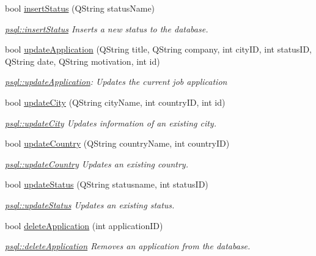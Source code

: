 \begin{DoxyCompactItemize}
bool \mbox{\hyperlink{classpsql_a601ee0bdc9430b1d674a857f7c94b767}{insert\+Status}} (Q\+String status\+Name)
\begin{DoxyCompactList}\small\item\em \mbox{\hyperlink{classpsql_a601ee0bdc9430b1d674a857f7c94b767}{psql\+::insert\+Status}} Inserts a new status to the database. \end{DoxyCompactList}\item 
bool \mbox{\hyperlink{classpsql_a836eea3c6deb2d6a3a357193a99d6ee7}{update\+Application}} (Q\+String title, Q\+String company, int city\+ID, int status\+ID, Q\+String date, Q\+String motivation, int id)
\begin{DoxyCompactList}\small\item\em \mbox{\hyperlink{classpsql_a836eea3c6deb2d6a3a357193a99d6ee7}{psql\+::update\+Application}}\+: Updates the current job application \end{DoxyCompactList}\item 
bool \mbox{\hyperlink{classpsql_a6adf2ba381783e520c03fe5324dcb010}{update\+City}} (Q\+String city\+Name, int country\+ID, int id)
\begin{DoxyCompactList}\small\item\em \mbox{\hyperlink{classpsql_a6adf2ba381783e520c03fe5324dcb010}{psql\+::update\+City}} Updates information of an existing city. \end{DoxyCompactList}\item 
bool \mbox{\hyperlink{classpsql_ae662278c5fb8ff3471ee1442e69482e2}{update\+Country}} (Q\+String country\+Name, int country\+ID)
\begin{DoxyCompactList}\small\item\em \mbox{\hyperlink{classpsql_ae662278c5fb8ff3471ee1442e69482e2}{psql\+::update\+Country}} Updates an existing country. \end{DoxyCompactList}\item 
bool \mbox{\hyperlink{classpsql_a620364c99c98e20720908deb045536a0}{update\+Status}} (Q\+String statusname, int status\+ID)
\begin{DoxyCompactList}\small\item\em \mbox{\hyperlink{classpsql_a620364c99c98e20720908deb045536a0}{psql\+::update\+Status}} Updates an existing status. \end{DoxyCompactList}\item 
bool \mbox{\hyperlink{classpsql_a999ee8e2d813892411ef502ebc055a79}{delete\+Application}} (int application\+ID)
\begin{DoxyCompactList}\small\item\em \mbox{\hyperlink{classpsql_a999ee8e2d813892411ef502ebc055a79}{psql\+::delete\+Application}} Removes an application from the database. \end{DoxyCompactList}\item 

\end{DoxyCompactItemize}
